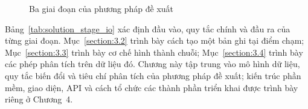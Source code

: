 \documentclass[../LuanVan.tex]{subfiles}
\begin{document}
\begin{figure}[H]
    \centering
    \caption{Ba giai đoạn của phương pháp đề xuất}
    \label{fig:solution_flow}
\end{figure}

Bảng~\ref{tab:solution_stage_io} xác định đầu vào, quy tắc chính và đầu ra của từng giai đoạn. Mục~\ref{section:3.2} trình bày cách tạo một bản ghi tại điểm chạm; Mục~\ref{section:3.3} trình bày cơ chế hình thành chuỗi; Mục~\ref{section:3.4} trình bày các phép phân tích trên dữ liệu đó. Chương này tập trung vào mô hình dữ liệu, quy tắc biến đổi và tiêu chí phân tích của phương pháp đề xuất; kiến trúc phần mềm, giao diện, API và cách tổ chức các thành phần triển khai được trình bày riêng ở Chương~4.
\end{document}
